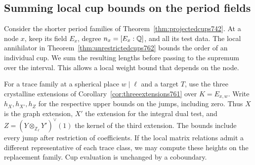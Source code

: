 \documentclass[a4paper,11pt]{article}
\theoremstyle{definition}
\theoremstyle{remark}
\newcommand{\ZZ}{\mathbb Z}\newcommand{\ord}{\operatorname{ord}}
\numberwithin{equation}{section}
\begin{document}
\subsection{Summing local cup bounds on the period fields}
\label{sec:sumcupheights763}
Consider the shorter period families of Theorem~\ref{thm:projectedcups742}.
At a node \(x\), keep its field \(E_x\), degree \(n_x=[E_x:\mathbb Q]\),
and all its test data. The local annihilator in
Theorem~\ref{thm:unrestrictedcups762} bounds the order of an
individual cup. We sum the resulting lengths before passing
to the supremum over the interval. This allows a local
weight bound that depends on the node.

For a trace family at a spherical place \(w\mid\ell\) and a
target \(T\), use the three crystalline extensions of
Corollary~\ref{cor:threeextensions761} over \(K=E_{x,w}\).
Write \(h_X,h_{X'},h_Z\) for the respective upper bounds
on the jumps, including zero. Thus \(X\) is the graph
extension, \(X'\) the extension for the integral dual test,
and \(Z=(Y\otimes_{\ZZ_\ell}Y')^\vee(1)\) the kernel of
the third extension. The bounds include every jump after
restriction of coefficients. If the local matrix relations
admit a different representative of each trace class, we
may compute these heights on the replacement family.
Cup evaluation is unchanged by a coboundary.
\end{document}
